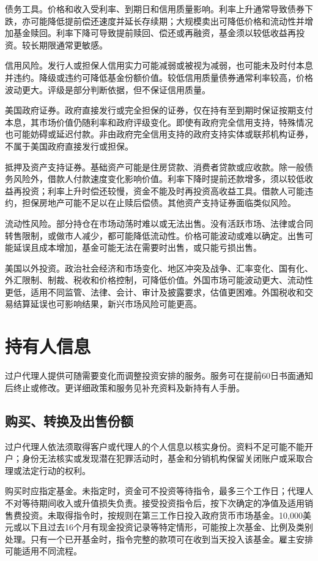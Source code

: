\documentclass[UTF8,fontset=none,11pt,a4paper]{ctexart}
\begin{document}
债务工具。价格和收入受利率、到期日和信用质量影响。利率上升通常导致债券下跌，亦可能降低提前偿还速度并延长存续期；大规模卖出可降低价格和流动性并增加基金赎回。利率下降可导致提前赎回、偿还或再融资，基金须以较低收益再投资。较长期限通常更敏感。


信用风险。发行人或担保人信用实力可能减弱或被视为减弱，也可能未及时付本息并违约。降级或违约可降低基金份额价值。较低信用质量债券通常利率较高，价格波动更大。评级是部分判断依据，但不保证信用质量。


美国政府证券。政府直接发行或完全担保的证券，仅在持有至到期时保证按期支付本息，其市场价值仍随利率和政府评级变化。即使有政府完全信用支持，特殊情况也可能妨碍或延迟付款。非由政府完全信用支持的政府支持实体或联邦机构证券，不属于美国政府直接发行或担保。


抵押及资产支持证券。基础资产可能是住房贷款、消费者贷款或应收款。除一般债务风险外，借款人付款速度变化影响价值。利率下降时提前还款增多，须以较低收益再投资；利率上升时偿还较慢，资金不能及时再投资高收益工具。借款人可能违约，担保房地产可能不足以在止赎后偿债。其他资产支持证券面临类似风险。


流动性风险。部分持仓在市场动荡时难以或无法出售。没有活跃市场、法律或合同转售限制，或做市人减少，都可能降低流动性。价格可能波动或难以确定。出售可能延误且成本增加，基金可能无法在需要时出售，或只能亏损出售。


美国以外投资。政治社会经济和市场变化、地区冲突及战争、汇率变化、国有化、外汇限制、制裁、税收和价格控制，可降低价值。外国市场可能波动更大、流动性更低，适用不同监管、法律、会计、审计及披露要求，估值更困难。外国税收和交易结算延误也可影响结果，新兴市场风险可能更高。


\section*{持有人信息}
过户代理人提供可随需要变化而调整投资安排的服务。服务可在提前60日书面通知后终止或修改。更详细政策和服务见补充资料及新持有人手册。


\subsection*{购买、转换及出售份额}
过户代理人依法须取得客户或代理人的个人信息以核实身份。资料不足可能不能开户；身份无法核实或发现潜在犯罪活动时，基金和分销机构保留关闭账户或采取合理或法定行动的权利。


购买时应指定基金。未指定时，资金可不投资等待指令，最多三个工作日；代理人不对等待期间收入或升值损失负责。接受投资指令后，按下次确定的净值及适用销售费投资。未取得指令时，按规则在第三工作日投入政府货币市场基金。10,000美元或以下且过去16个月有现金投资记录等特定情形，可能按上次基金、比例及类别处理。只有一个已开基金时，指令完整的款项可在收到当天投入该基金。雇主安排可能适用不同流程。
\end{document}
